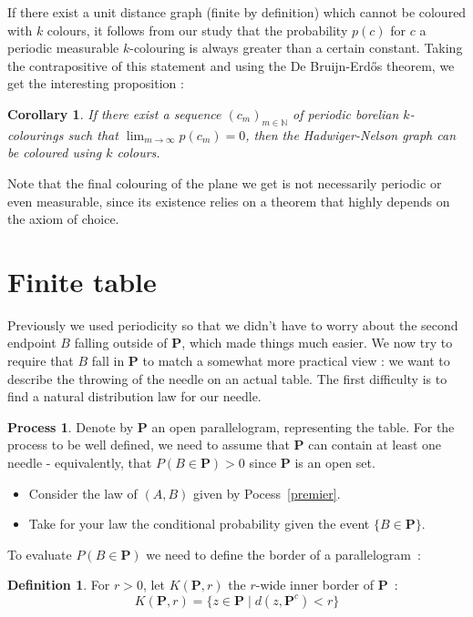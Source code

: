 \documentclass[a4paper,11pt]{article}
\newtheorem{cons}{Corollary}
\theoremstyle{definition}
\newtheorem{definition}{Definition}
\newtheorem{process}{Process}
\theoremstyle{remark}
\begin{document}
If there exist a unit distance graph (finite by definition) which cannot 
be coloured with $k$ colours, it 
follows from our study that the probability $p(c)$ for $c$ a periodic measurable 
$k$-colouring is always greater than a certain constant. Taking the 
contrapositive of this statement and using the De Bruijn-Erdős theorem, we get  
the interesting proposition :
\begin{cons} \label{suite}
 If there exist a sequence $(c_m)_{m \in \mathbb{N}}$ of periodic borelian 
 $k$-colourings such that $\lim_{m \to \infty} p(c_m) = 0$, then the 
 Hadwiger-Nelson graph can be coloured using $k$ colours.
\end{cons}
Note that the final colouring of the plane we get is not necessarily periodic 
or even measurable, since its existence relies on a theorem that highly depends 
on the axiom of choice.

\section{Finite table} \label{fini}

Previously we used periodicity so that we didn't have to worry about the second 
endpoint $B$ falling outside of $\mathbf{P}$, which made things much easier. We now 
try to require that $B$ fall in $\mathbf{P}$ to match a somewhat more practical 
view : we want to describe the throwing of the needle on an actual table. The 
first difficulty is to find a natural distribution law for our needle.

\begin{process} \label{encore}
Denote by $\mathbf{P}$ an open parallelogram, representing the table. For the 
process to be well defined, we need to assume that $\mathbf{P}$ can contain at
least one needle - equivalently, that $P(B \in \mathbf{P}) > 0$ since $\mathbf{P}$ 
is an open set.
\begin{itemize}
\item Consider the law of $(A,B)$ given by Pocess~\ref{premier}.
\item Take for your law the conditional probability given the event 
$\{B \in \mathbf{P} \}$.
\end{itemize}
\end{process}

To evaluate $P(B \in \mathbf{P})$ we need to define the border of a parallelogram~:
\begin{definition}
For $r>0$, let $K(\mathbf{P},r)$ the $r$-wide inner border of $\mathbf{P}$~:
\[K(\mathbf{P},r) = \{ z \in \mathbf{P} \mid d(z,\mathbf{P}^c) < r\} \] 
\end{definition}
\end{document}
